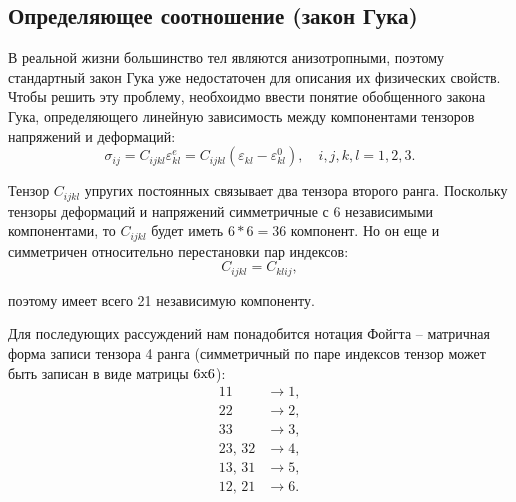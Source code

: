 \documentclass[12pt,a4paper]{article}
\begin{document}
    \subsection{Определяющее соотношение (закон Гука)}

    В реальной жизни большинство тел являются анизотропными, поэтому стандартный закон Гука уже недостаточен для описания их физических свойств. Чтобы решить эту проблему, необхоидмо ввести понятие обобщенного закона Гука, определяющего линейную зависимость между компонентами тензоров напряжений и деформаций:
    \begin{equation}
      \sigma_{ij} = C_{ijkl}\varepsilon_{kl}^e = C_{ijkl}( \varepsilon_{kl} - \varepsilon_{kl}^0 ), \quad i,j,k,l = 1, 2, 3.
      \label{Hook}
    \end{equation}

    Тензор $C_{ijkl}$ упругих постоянных связывает два тензора второго ранга. Поскольку тензоры деформаций и напряжений симметричные с $6$ независимыми компонентами, то $C_{ijkl}$ будет иметь $6*6 = 36$ компонент. Но он еще и симметричен относительно перестановки пар индексов: 
    \[
        C_{ijkl} = C_{klij},
    \]

  \noindent поэтому имеет всего 21 независимую компоненту.

  Для последующих рассуждений нам понадобится нотация Фойгта -- матричная форма записи тензора 4 ранга (симметричный по паре индексов тензор может быть записан в виде матрицы $6{\text x}6$):
  \begin{equation}
    \begin{split}
        11 &\rightarrow 1, \\
        22 &\rightarrow 2, \\
        33 &\rightarrow 3, \\
        23,\, 32 &\rightarrow 4, \\
        13,\, 31 &\rightarrow 5, \\
        12,\, 21 &\rightarrow 6. \\
    \end{split}
    \label{Foigt}
  \end{equation}
\end{document}
